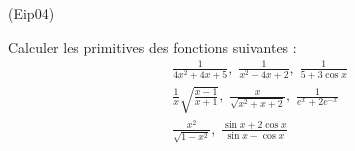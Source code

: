\begin{tiny}(Eip04)\end{tiny}
Calculer les primitives des fonctions suivantes :
\begin{align*}
\frac{1}{4x^2+4x+5},\; \frac{1}{x^2-4x+2} ,\; \frac{1}{5+3\cos x} \\
\frac{1}{x}\sqrt{\frac{x-1}{x+1}},\; \frac{x}{\sqrt{x^2+x+2}},\; \frac{1}{e^x+2e^{-x}}\\
\frac{x^2}{\sqrt{1-x^2}},\; \frac{\sin x +2\cos x}{\sin x -\cos x}
\end{align*}